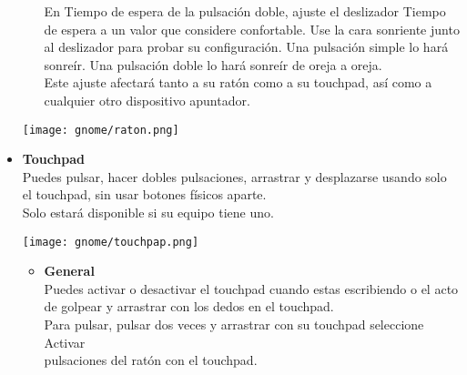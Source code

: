 \begin{itemize}
\begin{itemize}
En Tiempo de espera de la pulsación doble, ajuste el deslizador Tiempo de espera a un valor que considere confortable. Use la cara sonriente junto al deslizador para probar su configuración. Una pulsación simple lo hará sonreír. Una pulsación doble lo hará sonreír de oreja a oreja.\\

Este ajuste afectará tanto a su ratón como a su touchpad, así como a cualquier otro dispositivo apuntador.
\end{itemize}
\begin{center}
\texttt{[image: gnome/raton.png]} 
\end{center}
\item{\large \bf Touchpad}\\
Puedes pulsar, hacer dobles pulsaciones, arrastrar y desplazarse usando solo el touchpad, sin usar botones físicos aparte.\\
Solo estará disponible si su equipo tiene uno.
	\begin{center}
\texttt{[image: gnome/touchpap.png]}
\end{center} 
	\begin{itemize}
\item{\bf General}\\
Puedes activar o desactivar el touchpad cuando estas escribiendo o el acto de golpear y arrastrar con los dedos en el touchpad.\\ 

Para pulsar, pulsar dos veces y arrastrar con su touchpad seleccione Activar\\ pulsaciones del ratón con el touchpad.\\


\end{itemize}
\end{itemize}
